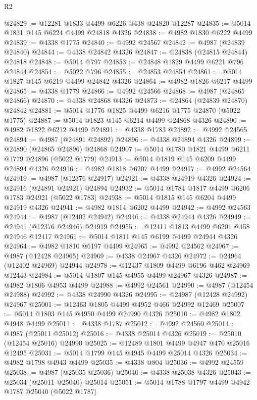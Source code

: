 \begin{lexlean}{R2}
\begin{coremodule}
@24829 := @12281 @1833 @4499 @6226 @438 @24820 @12287
@24835 := @5014 @1831 @145 @6224 @4499 @24818 @4326
@24838 := @4982 @1830 @6222 @4499
@24839 := @4338 @1775
@24840 := @4992 @24567
@24842 := @4987 (@24839 @24840)
@24844 := @4338 @24842 @4326
@24847 := @24838 (@24815 @24844) @24818
@24848 := @5014 @797
@24853 := @24848 @1829 @4499 @6221 @796 @24844
@24854 := @5022 @796
@24855 := @24853 @24854
@24861 := @5014 @1827 @145 @6219 @4499 @24842 @4326
@24864 := @4982 @1826 @6217 @4499
@24865 := @4338 @1779
@24866 := @4992 @24566
@24868 := @4987 (@24865 @24866)
@24870 := @4338 @24868 @4326
@24873 := @24864 (@24839 @24870) @24842
@24881 := @5014 @1776 @1825 @4499 @6216 @1775 @24870 (@5022 @1775)
@24887 := @5014 @1823 @145 @6214 @4499 @24868 @4326
@24890 := @4982 @1822 @6212 @4499
@24891 := @4338 @1783
@24892 := @4992 @24565
@24894 := @4987 (@24891 @24892)
@24896 := @4338 @24894 @4326
@24899 := @24890 (@24865 @24896) @24868
@24907 := @5014 @1780 @1821 @4499 @6211 @1779 @24896 (@5022 @1779)
@24913 := @5014 @1819 @145 @6209 @4499 @24894 @4326
@24916 := @4982 @1818 @6207 @4499
@24917 := @4992 @24564
@24919 := @4987 (@12376 @24917)
@24921 := @4338 @24919 @4326
@24924 := @24916 (@24891 @24921) @24894
@24932 := @5014 @1784 @1817 @4499 @6206 @1783 @24921 (@5022 @1783)
@24938 := @5014 @1815 @145 @6204 @4499 @24919 @4326
@24941 := @4982 @1814 @6202 @4499
@24942 := @4992 @24563
@24944 := @4987 (@12402 @24942)
@24946 := @4338 @24944 @4326
@24949 := @24941 (@12376 @24946) @24919
@24955 := @12411 @1813 @4499 @6201 @458 @24946 @12417
@24961 := @5014 @1811 @145 @6199 @4499 @24944 @4326
@24964 := @4982 @1810 @6197 @4499
@24965 := @4992 @24562
@24967 := @4987 (@12428 @24965)
@24969 := @4338 @24967 @4326
@24972 := @24964 (@12402 @24969) @24944
@24978 := @12437 @1809 @4499 @6196 @462 @24969 @12443
@24984 := @5014 @1807 @145 @4955 @4499 @24967 @4326
@24987 := @4982 @1806 @4953 @4499
@24988 := @4992 @24561
@24990 := @4987 (@12454 @24988)
@24992 := @4338 @24990 @4326
@24995 := @24987 (@12428 @24992) @24967
@25001 := @12463 @1805 @4499 @4952 @466 @24992 @12469
@25007 := @5014 @1803 @145 @4950 @4499 @24990 @4326
@25010 := @4982 @1802 @4948 @4499
@25011 := @4338 @1787
@25012 := @4992 @24560
@25014 := @4987 (@25011 @25012)
@25016 := @4338 @25014 @4326
@25019 := @25010 (@12454 @25016) @24990
@25025 := @12489 @1801 @4499 @4947 @470 @25016 @12495
@25031 := @5014 @1799 @145 @4945 @4499 @25014 @4326
@25034 := @4982 @1798 @4943 @4499
@25035 := @4338 @804
@25036 := @4992 @24559
@25038 := @4987 (@25035 @25036)
@25040 := @4338 @25038 @4326
@25043 := @25034 (@25011 @25040) @25014
@25051 := @5014 @1788 @1797 @4499 @4942 @1787 @25040 (@5022 @1787)

\end{coremodule}
\end{lexlean}
